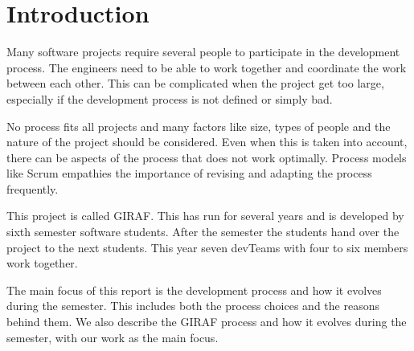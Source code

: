 \section{Introduction}

Many software projects require several people to participate in the development process. The engineers need to be able to work together and coordinate the work between each other. This can be complicated when the project get too large, especially if the development process is not defined or simply bad.

No process fits all projects and many factors like size, types of people and the nature of the project should be considered. Even when this is taken into account, there can be aspects of the process that does not work optimally. Process models like \gls{Scrum} empathies the importance of revising and adapting the process frequently\cite{Scrum}.

This project is called GIRAF. This has run for several years and is developed by sixth semester software students. After the semester the students hand over the project to the next students. This year seven \glspl{devTeam} with four to six members work together.

The main focus of this report is the development process and how it evolves during the semester. This includes both the process choices and the reasons behind them. We also describe the GIRAF process and how it evolves during the semester, with our work as the main focus.